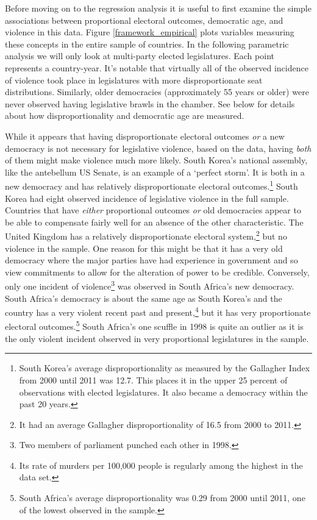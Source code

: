 \documentclass[a4paper]{article}\usepackage[]{graphicx}\usepackage[]{color}
\begin{document}
Before moving on to the regression analysis it is useful to first examine the simple associations between proportional electoral outcomes, democratic age, and violence in this data. Figure \ref{framework_empirical} plots variables measuring these concepts in the entire sample of countries. In the following parametric analysis we will only look at multi-party elected legislatures. Each point represents a country-year. It's notable that virtually all of the observed incidence of violence took place in legislatures with more disproportionate seat distributions. Similarly, older democracies (approximately 55 years or older) were never observed having legislative brawls in the chamber. See below for details about how disproportionality and democratic age are measured.

While it appears that having disproportionate electoral outcomes \emph{or} a new democracy is not necessary for legislative violence, based on the data, having \emph{both} of them might make violence much more likely. South Korea's national assembly, like the antebellum US Senate, is an example of a `perfect storm'. It is both in a new democracy and has relatively disproportionate electoral outcomes.\footnote{South Korea’s average disproportionality as measured by the Gallagher Index \citep{Gallagher1991} from 2000 until 2011 was 12.7. This places it in the upper 25 percent of observations with elected legislatures. It also became a democracy within the past 20 years.} South Korea had eight observed incidence of legislative violence in the full sample. Countries that have \emph{either} proportional outcomes \emph{or} old democracies appear to be able to compensate fairly well for an absence of the other characteristic. The United Kingdom has a relatively disproportionate electoral system,\footnote{It had an average Gallagher disproportionality of 16.5 from 2000 to 2011.} but no violence in the sample. One reason for this might be that it has a very old democracy where the major parties have had experience in government and so view commitments to allow for the alteration of power to be credible. Conversely, only one incident of violence\footnote{Two members of parliament punched each other in 1998.} was observed in South Africa's new democracy. South Africa's democracy is about the same age as South Korea's and the country has a very violent recent past and present,\footnote{Its rate of murders per 100,000 people is regularly among the highest in the \citealt{UNMurder2013} data set.} but it has very proportionate electoral outcomes.\footnote{South Africa’s average disproportionality was 0.29 from 2000 until 2011, one of the lowest observed in the sample.} South Africa's one scuffle in 1998 is quite an outlier as it is the only violent incident observed in very proportional legislatures in the sample. 
\end{document}

